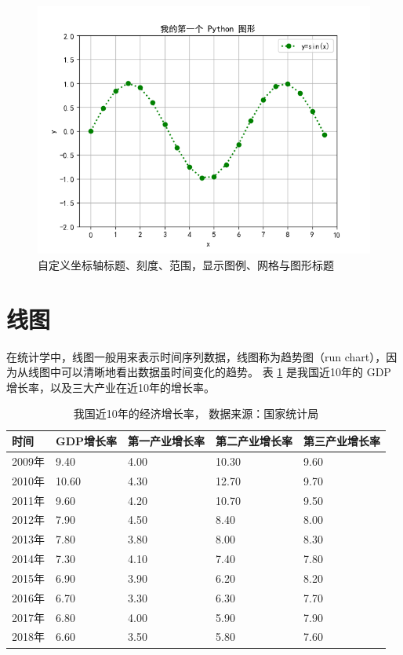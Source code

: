 \begin{figure}[!ht]
  \centering
  \includegraphics[width=\textwidth]{figure/sinx2.png}
  \caption{自定义坐标轴标题、刻度、范围，显示图例、网格与图形标题}\label{fig:sinx2}
\end{figure}


\section{线图}

在统计学中，线图一般用来表示时间序列数据，线图称为趋势图（run chart），因为从线图中可以清晰地看出数据虽时间变化的趋势。 表 \ref{table:GDP} 是我国近10年的 GDP 增长率，以及三大产业在近10年的增长率。


\begin{table}[!ht]
\centering
\renewcommand{\arraystretch}{1.2}
\caption{我国近10年的经济增长率， 数据来源：国家统计局}\label{table:GDP}
\begin{tabular}{|l|l|l|l|l|}
\hline

时间 & GDP增长率 & 第一产业增长率 & 第二产业增长率 & 第三产业增长率 \\ \hline
2009年 & 9.40  & 4.00  & 10.30  & 9.60  \\ \hline
2010年 & 10.60  & 4.30  & 12.70  & 9.70  \\ \hline
2011年 & 9.60  & 4.20  & 10.70  & 9.50  \\ \hline
2012年 & 7.90  & 4.50  & 8.40  & 8.00  \\ \hline
2013年 & 7.80  & 3.80  & 8.00  & 8.30  \\ \hline
2014年 & 7.30  & 4.10  & 7.40  & 7.80  \\ \hline
2015年 & 6.90  & 3.90  & 6.20  & 8.20  \\ \hline
2016年 & 6.70  & 3.30  & 6.30  & 7.70  \\ \hline
2017年 & 6.80  & 4.00  & 5.90  & 7.90  \\ \hline
2018年 & 6.60  & 3.50  & 5.80  & 7.60 \\ \hline
\end{tabular}
\end{table}



